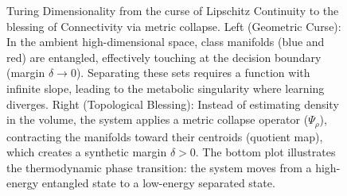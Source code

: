 \documentclass{article}
\begin{document}
\begin{figure}
{
    }
    \vspace{0.1in}
\caption{Turing Dimensionality from the curse of Lipschitz Continuity to the blessing of Connectivity via metric collapse.
Left (Geometric Curse): In the ambient high-dimensional space, class manifolds (blue and red) are entangled, effectively touching at the decision boundary (margin $\delta \to 0$). Separating these sets requires a function with infinite slope, leading to the metabolic singularity where learning diverges.
Right (Topological Blessing): Instead of estimating density in the volume, the system applies a metric collapse operator ($\Psi_\rho$), contracting the manifolds toward their centroids (quotient map), which creates a synthetic margin $\delta > 0$.
The bottom plot illustrates the thermodynamic phase transition: the system moves from a high-energy entangled state to a low-energy separated state.}
\vspace{-0.2in} 
\label{fig:CoD}
\end{figure}
 
\end{document}
